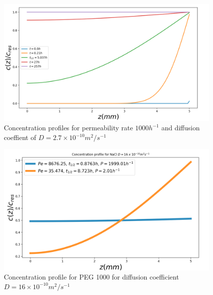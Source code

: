 \documentclass[11ptm,oneside,a4paper]{report}
\begin{document}
    \begin{figure}[!htb]
      \begin{center}
          \includegraphics[scale=0.24]{figures/PEG1000_conce_prof.png}
          \caption{Concentration profiles for permeability rate $1{}000 h^{-1}$ and diffusion coeffient of $D = 2.7 \times 10^{-10} m^2/s^{-1}$ \label{conce_prof_PEG1000_multi}}  
      \end{center} 
    \end{figure}
    \noindent 

    \begin{figure}[!htb]
      \begin{center}
          \includegraphics[scale=0.25]{figures/SALT_thalf.png}
           \caption{Concentration profile for PEG 1000 for diffusion coefficient 
          $D = 16 \times 10^{-10} m^2/s^{-1}$ \label{conc_prof_NaCl}}
      \end{center} 
    \end{figure}{}
\end{document}
